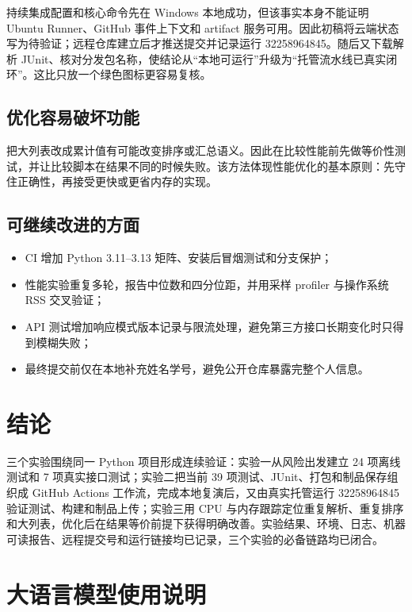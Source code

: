\documentclass[UTF8,zihao=-4,a4paper]{ctexart}
\begin{document}
持续集成配置和核心命令先在 Windows 本地成功，但该事实本身不能证明 Ubuntu Runner、GitHub 事件上下文和 artifact 服务可用。因此初稿将云端状态写为待验证；远程仓库建立后才推送提交并记录运行 32258964845。随后又下载解析 JUnit、核对分发包名称，使结论从“本地可运行”升级为“托管流水线已真实闭环”。这比只放一个绿色图标更容易复核。

\subsection{优化容易破坏功能}

把大列表改成累计值有可能改变排序或汇总语义。因此在比较性能前先做等价性测试，并让比较脚本在结果不同的时候失败。该方法体现性能优化的基本原则：先守住正确性，再接受更快或更省内存的实现。

\subsection{可继续改进的方面}

\begin{itemize}
  \item CI 增加 Python 3.11--3.13 矩阵、安装后冒烟测试和分支保护；
  \item 性能实验重复多轮，报告中位数和四分位距，并用采样 profiler 与操作系统 RSS 交叉验证；
  \item API 测试增加响应模式版本记录与限流处理，避免第三方接口长期变化时只得到模糊失败；
  \item 最终提交前仅在本地补充姓名学号，避免公开仓库暴露完整个人信息。
\end{itemize}

\section{结论}

三个实验围绕同一 Python 项目形成连续验证：实验一从风险出发建立 24 项离线测试和 7 项真实接口测试；实验二把当前 39 项测试、JUnit、打包和制品保存组织成 GitHub Actions 工作流，完成本地复演后，又由真实托管运行 32258964845 验证测试、构建和制品上传；实验三用 CPU 与内存跟踪定位重复解析、重复排序和大列表，优化后在结果等价前提下获得明确改善。实验结果、环境、日志、机器可读报告、远程提交号和运行链接均已记录，三个实验的必备链路均已闭合。

\section*{大语言模型使用说明}
\end{document}
